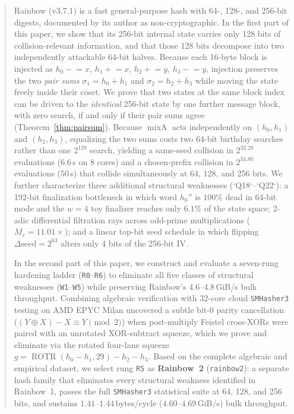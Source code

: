 \documentclass[10pt]{article}
\theoremstyle{definition}
\newcommand{\ROTR}{\operatorname{ROTR}}
\newcommand{\mixA}{\operatorname{mixA}}
\newcommand{\code}[1]{\texttt{#1}}
\begin{document}
\begin{abstract}
Rainbow (v3.7.1) is a fast general-purpose hash with 64-, 128-, and 256-bit digests, documented by its author as non-cryptographic. In the first part of this paper, we show that its 256-bit internal state carries only 128 bits of collision-relevant information, and that those 128 bits decompose into two independently attackable 64-bit halves. Because each 16-byte block is injected as $h_0 \mathrel{-}= x$, $h_1 \mathrel{+}= x$, $h_2 \mathrel{+}= y$, $h_3 \mathrel{-}= y$, injection preserves the two \emph{pair sums} $\sigma_1 = h_0 + h_1$ and $\sigma_2 = h_2 + h_3$ while moving the state freely inside their coset. We prove that two states at the same block index can be driven to the \emph{identical} 256-bit state by one further message block, with zero search, if and only if their pair sums agree (Theorem~\ref{thm:pairsum}). Because $\mixA$ acts independently on $(h_0,h_1)$ and $(h_2,h_3)$, equalizing the two sums costs two 64-bit birthday searches rather than one $2^{128}$ search, yielding a same-seed collision in $2^{32.28}$ evaluations ($6.6$\,s on 8 cores) and a chosen-prefix collision in $2^{34.80}$ evaluations ($50$\,s) that collide simultaneously at 64, 128, and 256 bits. We further characterize three additional structural weaknesses (`Q18`--`Q22`): a 192-bit finalization bottleneck in which word $h_0''$ is $100\%$ dead in 64-bit mode and the $w=4$ toy finalizer reaches only $6.1\%$ of the state space; 2-adic differential filtration rays across odd-prime multiplications ($M_r = 11.01\times$); and a linear top-bit seed schedule in which flipping $\Delta\text{seed}=2^{63}$ alters only 4 bits of the 256-bit IV.

In the second part of this paper, we construct and evaluate a seven-rung hardening ladder (\code{R0}--\code{R6}) to eliminate all five classes of structural weaknesses (\code{W1}--\code{W5}) while preserving Rainbow's 4.6--4.8\,GiB/s bulk throughput. Combining algebraic verification with 32-core cloud \code{SMHasher3} testing on AMD EPYC Milan uncovered a subtle bit-0 parity cancellation ($(Y \oplus X) - X \equiv Y \pmod 2$) when post-multiply Feistel cross-XORs were paired with an unrotated XOR-subtract squeeze, which we prove and eliminate via the rotated four-lane squeeze $g = \ROTR(h_0 - h_1, 29) - h_2 - h_3$. Based on the complete algebraic and empirical dataset, we select rung \code{R5} as \textbf{Rainbow~2} (\code{rainbow2}): a separate hash family that eliminates every structural weakness identified in Rainbow~1, passes the full \code{SMHasher3} statistical suite at 64, 128, and 256 bits, and sustains $1.41$--$1.44$\,bytes/cycle ($4.60$--$4.69$\,GiB/s) bulk throughput.
\end{abstract}
\end{document}
